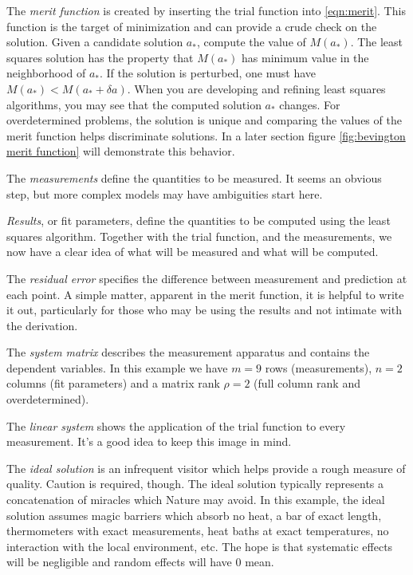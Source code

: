 The \emph{merit function} is created by inserting the trial function into \eqref{eqn:merit}. This function is the target of minimization and can provide a crude check on the solution. Given a candidate solution $a_{*}$, compute the value of $M(a_{*})$. The least squares solution has the property that $M(a_{*})$ has minimum value in the neighborhood of $a_{*}$. If the solution is perturbed, one must have $M(a_{*}) < M(a_{*} + \delta a)$. When you are developing and refining least squares algorithms, you may see that the computed solution $a_{*}$ changes. For overdetermined problems, the solution is unique and comparing the values of the merit function helps discriminate solutions. In a later section figure \ref{fig:bevington merit function} will demonstrate this behavior.

The \emph{measurements} define the quantities to be measured. It seems an obvious step, but more complex models may have ambiguities start here.

\emph{Results}, or fit parameters, define the quantities to be computed using the least squares algorithm. Together with the trial function, and the measurements, we now have a clear idea of what will be measured and what will be computed.

The \emph{residual error} specifies the difference between measurement and prediction at each point. A simple matter, apparent in the merit function, it is helpful to write it out, particularly for those who may be using the results and not intimate with the derivation.

The \emph{system matrix} describes the measurement apparatus and contains the dependent variables. In this example we have $m=9$ rows (measurements), $n=2$ columns (fit parameters) and a matrix rank $\rho = 2$ (full column rank and overdetermined).

The \emph{linear system} shows the application of the trial function to every measurement. It's a good idea to keep this image in mind.

The \emph{ideal solution} is an infrequent visitor which helps provide a rough measure of quality. Caution is required, though. The ideal solution typically represents a concatenation of miracles which Nature may avoid. In this example, the ideal solution assumes magic barriers which absorb no heat, a bar of exact length, thermometers with exact measurements, heat baths at exact temperatures, no interaction with the local environment, etc. The hope is that systematic effects will be negligible and random effects will have 0 mean.

